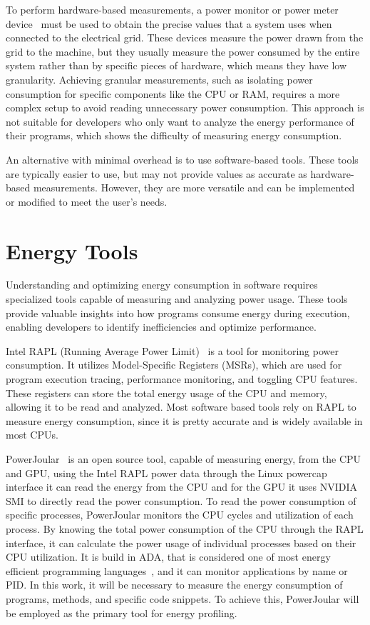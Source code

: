 To perform hardware-based measurements, a power monitor or power meter device~\cite{hackenberg2013power,ge2009powerpack} must be used to obtain the precise values that a system uses when connected to the electrical grid. These devices measure the power drawn from the grid to the machine, but they usually measure the power consumed by the entire system rather than by specific pieces of hardware, which means they have low granularity. Achieving granular measurements, such as isolating power consumption for specific components like the CPU or RAM, requires a more complex setup to avoid reading unnecessary power consumption. This approach is not suitable for developers who only want to analyze the energy performance of their programs, which shows the difficulty of measuring energy consumption.

An alternative with minimal overhead is to use software-based tools. These tools are typically easier to use, but may not provide values as accurate as hardware-based measurements. However, they are more versatile and can be implemented or modified to meet the user's needs. 


\section{Energy Tools} \label{sec:background_energy}

Understanding and optimizing energy consumption in software requires specialized tools capable of measuring and analyzing power usage. These tools provide valuable insights into how programs consume energy during execution, enabling developers to identify inefficiencies and optimize performance.

Intel RAPL (Running Average Power Limit)~\cite{intel_rapl} is a tool for monitoring power consumption. It utilizes Model-Specific Registers (MSRs), which are used for program execution tracing, performance monitoring, and toggling CPU features. These registers can store the total energy usage of the CPU and memory, allowing it to be read and analyzed. Most software based tools rely on RAPL to measure energy consumption, since it is pretty accurate and is widely available in most CPUs.

PowerJoular~\cite{noureddine-ie-2022} is an open source tool, capable of measuring energy, from the CPU and GPU, using the Intel RAPL power data through the Linux powercap interface it can read the energy from the CPU and for the GPU it uses NVIDIA SMI to directly read the power consumption.
To read the power consumption of specific processes, PowerJoular monitors the CPU cycles and utilization of each process. By knowing the total power consumption of the CPU through the RAPL interface, it can calculate the power usage of individual processes based on their CPU utilization.
It is build in ADA, that is considered one of most energy efficient programming languages~\cite{PEREIRA2021102609}, and it can monitor applications by name or PID. In this work, it will be necessary to measure the energy consumption of programs, methods, and specific code snippets. To achieve this, PowerJoular will be employed as the primary tool for energy profiling.

